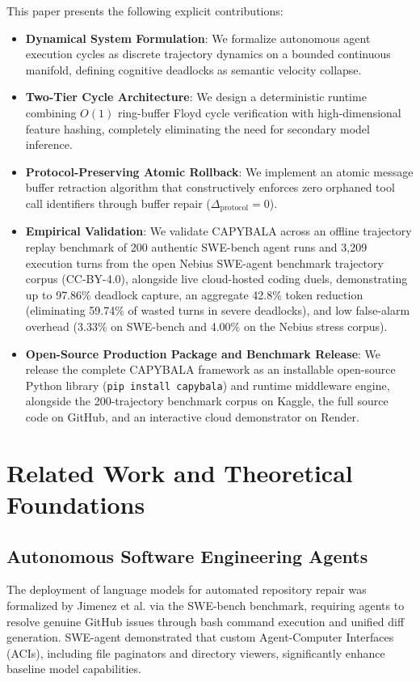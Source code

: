 \documentclass[journal]{IEEEtran}
\begin{document}
This paper presents the following explicit contributions:
\begin{itemize}[leftmargin=12pt, topsep=2pt, itemsep=1pt]
    \item \textbf{Dynamical System Formulation}: We formalize autonomous agent execution cycles as discrete trajectory dynamics on a bounded continuous manifold, defining cognitive deadlocks as semantic velocity collapse.
    \item \textbf{Two-Tier Cycle Architecture}: We design a deterministic runtime combining $O(1)$ ring-buffer Floyd cycle verification with high-dimensional feature hashing, completely eliminating the need for secondary model inference.
    \item \textbf{Protocol-Preserving Atomic Rollback}: We implement an atomic message buffer retraction algorithm that constructively enforces zero orphaned tool call identifiers through buffer repair ($\Delta_{\text{protocol}} = 0$).
    \item \textbf{Empirical Validation}: We validate CAPYBALA across an offline trajectory replay benchmark of 200 authentic SWE-bench agent runs and 3,209 execution turns from the open Nebius SWE-agent benchmark trajectory corpus (CC-BY-4.0), alongside live cloud-hosted coding duels, demonstrating up to 97.86\% deadlock capture, an aggregate 42.8\% token reduction (eliminating 59.74\% of wasted turns in severe deadlocks), and low false-alarm overhead (3.33\% on SWE-bench and 4.00\% on the Nebius stress corpus).
    \item \textbf{Open-Source Production Package and Benchmark Release}: We release the complete CAPYBALA framework as an installable open-source Python library (\texttt{pip install capybala}) and runtime middleware engine, alongside the 200-trajectory benchmark corpus on Kaggle, the full source code on GitHub, and an interactive cloud demonstrator on Render.
\end{itemize}

\section{Related Work and Theoretical Foundations}

\subsection{Autonomous Software Engineering Agents}
The deployment of language models for automated repository repair was formalized by Jimenez et al. \cite{jimenez2024swebench} via the SWE-bench benchmark, requiring agents to resolve genuine GitHub issues through bash command execution and unified diff generation. SWE-agent \cite{yang2024sweagent} demonstrated that custom Agent-Computer Interfaces (ACIs), including file paginators and directory viewers, significantly enhance baseline model capabilities.
\end{document}
